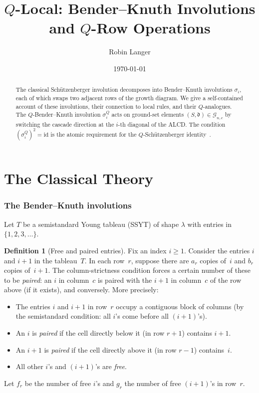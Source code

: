 \documentclass[11pt]{article}
\title{$Q$-Local: Bender--Knuth Involutions \\
  and $Q$-Row Operations}
\author{Robin Langer}
\date{\today}
\theoremstyle{plain}
\theoremstyle{definition}
\newtheorem{definition}[theorem]{Definition}
\begin{document}
\maketitle

\begin{abstract}
The classical Sch\"utzenberger involution decomposes into
Bender--Knuth involutions $\sigma_i$, each of which swaps two
adjacent rows of the growth diagram.  We give a self-contained
account of these involutions, their connection to local rules,
and their $Q$-analogues.  The $Q$-Bender--Knuth involution
$\sigma_i^Q$ acts on ground-set elements
$(S, \mathfrak{d}) \in \mathcal{G}_{n,c}$ by switching the
cascade direction at the $i$-th diagonal of the ALCD\@.  The
condition $(\sigma_i^Q)^2 = \mathrm{id}$ is the atomic
requirement for the $Q$-Sch\"utzenberger
identity~\cite{Q_SCHUTZ}.
\end{abstract}

\tableofcontents


\part{The Classical Theory}


\section{The Bender--Knuth involutions}
\label{sec:BK-def}

Let $T$ be a semistandard Young tableau (SSYT) of shape
$\lambda$ with entries in $\{1, 2, 3, \ldots\}$.

\begin{definition}[Free and paired entries]
\label{def:free-paired}
Fix an index $i \geq 1$.  Consider the entries $i$ and
$i + 1$ in the tableau~$T$.  In each row~$r$, suppose there
are $a_r$ copies of~$i$ and $b_r$ copies of~$i + 1$.  The
column-strictness condition forces a certain number of these
to be \emph{paired}: an $i$ in column~$c$ is paired with the
$i+1$ in column~$c$ of the row above (if it exists), and
conversely.  More precisely:
\begin{itemize}
  \item The entries $i$ and $i+1$ in row~$r$ occupy a
    contiguous block of columns (by the semistandard
    condition: all $i$'s come before all $(i+1)$'s).
  \item An $i$ is \emph{paired} if the cell directly below it
    (in row $r+1$) contains $i+1$.
  \item An $i+1$ is \emph{paired} if the cell directly above
    it (in row $r-1$) contains~$i$.
  \item All other $i$'s and $(i+1)$'s are \emph{free}.
\end{itemize}
Let $f_r$ be the number of free $i$'s and $g_r$ the number of
free $(i+1)$'s in row~$r$.
\end{definition}
\end{document}
